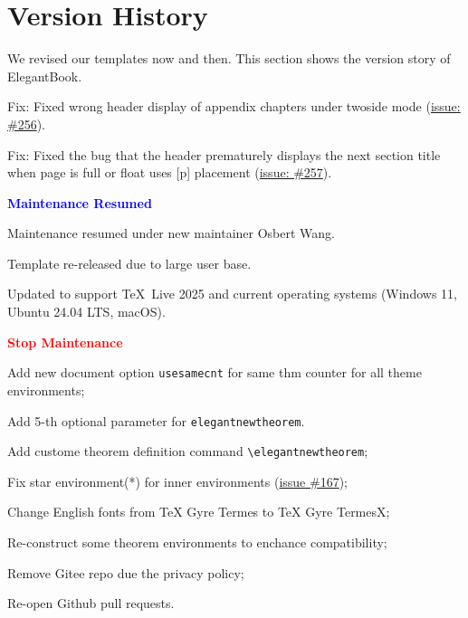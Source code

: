 \documentclass[11pt]{elegantbook}
\begin{document}
\chapter{Version History}
We revised our templates now and then. This section shows the version story of ElegantBook.


\begin{change}
  \item Fix: Fixed wrong header display of appendix chapters under twoside mode (\href{https://github.com/ElegantLaTeX/ElegantBook/issues/256}{issue: \#256}).
  \item Fix: Fixed the bug that the header prematurely displays the next section title when page is full or float uses [p] placement (\href{https://github.com/ElegantLaTeX/ElegantBook/issues/257}{issue: \#257}).
\end{change}

  \textcolor{blue}{\bfseries Maintenance Resumed}

\begin{change}
  \item Maintenance resumed under new maintainer Osbert Wang.
  \item Template re-released due to large user base.
  \item Updated to support \TeX~Live 2025 and current operating systems (Windows 11, Ubuntu 24.04 LTS, macOS).
\end{change}

  \textcolor{red}{\bfseries Stop Maintenance}

\begin{change}
  \item Add new document option \lstinline|usesamecnt| for same thm counter for all theme environments;
  \item Add 5-th optional parameter for \lstinline|elegantnewtheorem|.
\end{change}



\begin{change}
  \item Add custome theorem definition command \lstinline{\elegantnewtheorem};
  \item Fix star environment(*) for inner environments (\href{https://github.com/ElegantLaTeX/ElegantBook/issues/167}{issue \#167});
  \item Change English fonts from TeX Gyre Termes to TeX Gyre TermesX;
  \item Re-construct some theorem environments to enchance compatibility;
  \item Remove Gitee repo due the privacy policy;
  \item Re-open Github pull requests.
\end{change}
\end{document}
